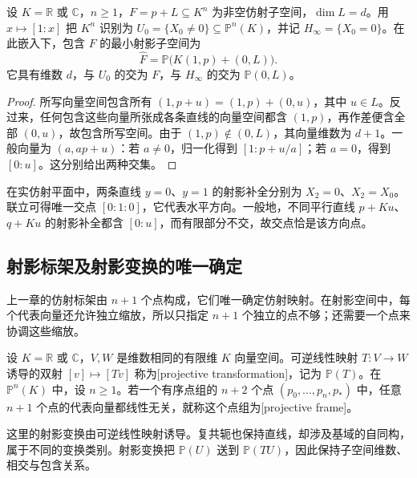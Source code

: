 \begin{proposition}\label{g1:prop:affine-projective-completion}
	设 \(K=\mathbb R\) 或 \(\mathbb C\)，\(n\geq1\)，\(F=p+L\subseteq K^n\) 为非空仿射子空间，\(\dim L=d\)。用 \(x\mapsto[1:x]\) 把 \(K^n\) 识别为 \(U_0=\{X_0\ne0\}\subseteq\mathbb P^n(K)\)，并记 \(H_\infty=\{X_0=0\}\)。在此嵌入下，包含 \(F\) 的最小射影子空间为
	\[
		\widehat F=\mathbb P\bigl(K(1,p)+(0,L)\bigr).
	\]
	它具有维数 \(d\)，与 \(U_0\) 的交为 \(F\)，与 \(H_\infty\) 的交为 \(\mathbb P(0,L)\)。
\end{proposition}
\begin{proof}
	所写向量空间包含所有 \((1,p+u)=(1,p)+(0,u)\)，其中 \(u\in L\)。反过来，任何包含这些向量所张成各条直线的向量空间都含 \((1,p)\)，再作差便含全部 \((0,u)\)，故包含所写空间。由于 \((1,p)\notin(0,L)\)，其向量维数为 \(d+1\)。一般向量为 \((a,ap+u)\)：若 \(a\ne0\)，归一化得到 \([1:p+u/a]\)；若 \(a=0\)，得到 \([0:u]\)。这分别给出两种交集。
\end{proof}

\begin{example}\label{g1:exm:parallel-infinity}
	在实仿射平面中，两条直线 \(y=0\)、\(y=1\) 的射影补全分别为 \(X_2=0\)、\(X_2=X_0\)。联立可得唯一交点 \([0:1:0]\)，它代表水平方向。一般地，不同平行直线 \(p+Ku\)、\(q+Ku\) 的射影补全都含 \([0:u]\)，而有限部分不交，故交点恰是该方向点。
\end{example}

\subsection{射影标架及射影变换的唯一确定}
\label{g1:subsec:0201:03}

上一章的仿射标架由 \(n+1\) 个点构成，它们唯一确定仿射映射。在射影空间中，每个代表向量还允许独立缩放，所以只指定 \(n+1\) 个独立的点不够；还需要一个点来协调这些缩放。

\begin{definition}\label{g1:def:projective-frame}
	设 \(K=\mathbb R\) 或 \(\mathbb C\)，\(V,W\) 是维数相同的有限维 \(K\) 向量空间。可逆线性映射 \(T:V\rightarrow W\) 诱导的双射 \([v]\mapsto[Tv]\) 称为[projective transformation]，记为 \(\mathbb P(T)\)。在 \(\mathbb P^n(K)\) 中，设 \(n\geq1\)。若一个有序点组的 \(n+2\) 个点 \((p_0,\ldots,p_n,p_*)\) 中，任意 \(n+1\) 个点的代表向量都线性无关，就称这个点组为[projective frame]。
\end{definition}

这里的射影变换由可逆线性映射诱导。复共轭也保持直线，却涉及基域的自同构，属于不同的变换类别。射影变换把 \(\mathbb P(U)\) 送到 \(\mathbb P(TU)\)，因此保持子空间维数、相交与包含关系。

